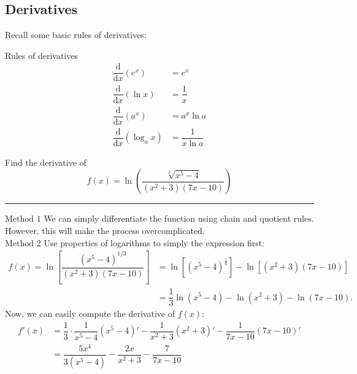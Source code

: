 \documentclass[12pt,a4paper]{article}
\def\d{{\mathrm{d}}}
\begin{document}
\subsection{Derivatives}
Recall some basic rules of derivatives: 
\begin{thm}{Rules of derivatives}
	$$\begin{aligned}
		\dfrac{\d}{\d x}\left(e^x\right)&=e^x\\
		\dfrac{\d}{\d x}\left(\ln x\right)&=\dfrac{1}{x}\\
		\dfrac{\d}{\d x}\left(a^x\right)&=a^x\ln a\\
		\dfrac{\d}{\d x}\left(\log_ax\right)&=\dfrac{1}{x\ln a}
	\end{aligned}$$
\end{thm}
\begin{eg}{Find the derivative of }
	$$f(x)=\ln\left(\dfrac{\sqrt[3]{x^5-4}}{(x^2+3)(7x-10)}\right)$$
	\noindent\rule[0.25\baselineskip]{\textwidth}{1pt}
	$\boxed{\text{Method 1}}$ We can simply differentiate the function using chain and quotient rules. However, this will make the process overcomplicated. \\
	$\boxed{\text{Method 2}}$ Use properties of logarithms to simply the expression first: 
	$$\begin{aligned}
		f(x)=\ln\left[\dfrac{(x^5-4)^{1/3}}{(x^2+3)(7x-10)}\right]&=\ln\left[(x^5-4)^{\frac{1}{3}}\right]-\ln\left[(x^2+3)(7x-10)\right]\\
		&=\dfrac{1}{3}\ln(x^5-4)-\ln(x^2+3)-\ln(7x-10).
	\end{aligned}$$
	Now, we can easily compute the derivative of $f(x)$:
	$$\begin{aligned}
		f'(x)&=\dfrac{1}{3}\cdot\dfrac{1}{x^5-4}(x^5-4)'-\dfrac{1}{x^2+3}(x^2+3)'-\dfrac{1}{7x-10}(7x-10)'\\
		&=\dfrac{5x^4}{3(x^5-4)}-\dfrac{2x}{x^2+3}-\dfrac{7}{7x-10}
	\end{aligned}$$
\end{eg}
\end{document}
